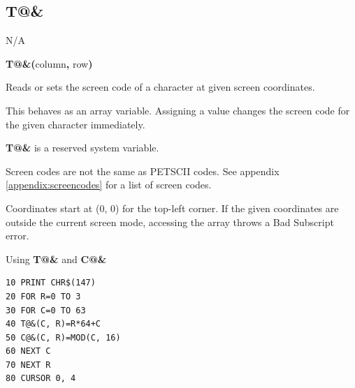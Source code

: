 \subsection{T@\&}
\begin{description}[leftmargin=2cm,style=nextline]
\item [Token:]    N/A

\item [Format:]   {\bf T@\&(}column{\bf ,} row{\bf)}

\item [Usage:]    Reads or sets the screen code of a character at given screen coordinates.

                  This behaves as an array variable. Assigning a value changes the screen code for the given character immediately.

\item[Remarks:]   {\bf T@\&} is a reserved system variable.

                  Screen codes are not the same as PETSCII codes. See appendix \vref{appendix:screencodes} for a list of screen codes.

                  Coordinates start at (0, 0) for the top-left corner. If the given coordinates are outside the current screen mode, accessing the array throws a Bad Subscript error.

\item [Example:]  Using {\bf T@\&} and {\bf C@\&}

\begin{tcolorbox}[colback=black,coltext=white]
\verbatimfont{\codefont}
\begin{verbatim}
10 PRINT CHR$(147)
20 FOR R=0 TO 3
30 FOR C=0 TO 63
40 T@&(C, R)=R*64+C
50 C@&(C, R)=MOD(C, 16)
60 NEXT C
70 NEXT R
80 CURSOR 0, 4
\end{verbatim}
\end{tcolorbox}
\end{description}


\newpage
